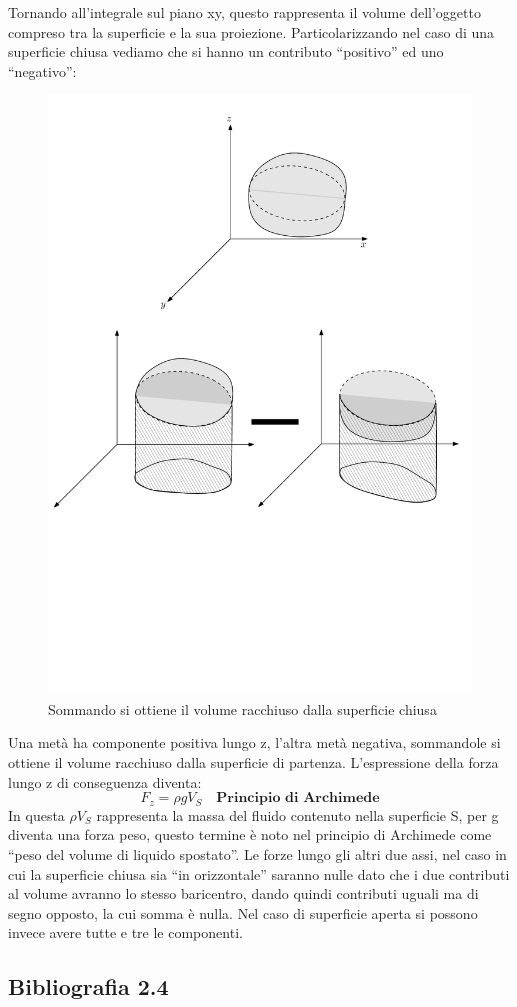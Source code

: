 Tornando all'integrale sul piano xy, questo rappresenta il volume dell'oggetto compreso tra la superficie e la sua proiezione. Particolarizzando nel caso di una superficie chiusa vediamo che si hanno un contributo ``positivo'' ed uno ``negativo'':
	\begin{figure}[ht]
		\includegraphics[scale=0.60]{./2.4 Spinte sulle superfici/2.4-6}
		\centering
		\caption{Sommando si ottiene il volume racchiuso dalla superficie chiusa}
	\end{figure}
Una metà ha componente positiva lungo z, l'altra metà negativa, sommandole si ottiene il volume racchiuso dalla superficie di partenza.
L'espressione della forza lungo z di conseguenza diventa:
	\begin{equation*}
		F_z = \rho g V_S \quad \textbf{Principio di Archimede}
	\end{equation*}
In questa $\rho V_S$ rappresenta la massa del fluido contenuto nella superficie S, per g diventa una forza peso, questo termine è noto nel principio di Archimede come ``peso del volume di liquido spostato''.
Le forze lungo gli altri due assi, nel caso in cui la superficie chiusa sia ``in orizzontale'' saranno nulle dato che i due contributi al volume avranno lo stesso baricentro, dando quindi contributi uguali ma di segno opposto, la cui somma è nulla.		
Nel caso di superficie aperta si possono invece avere tutte e tre le componenti.
	
\subsection*{Bibliografia 2.4}
\cite[Cap.\ 3.4, 3.5, 3.6, 3.7]{CengelCimbala}\\
\cite[Cap.\ 3.4, 3.5, 3.6]{PnueliGutfinger}